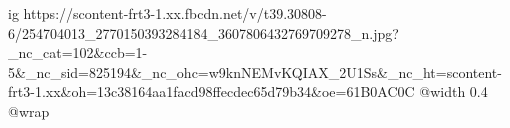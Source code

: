  
 
 
 
 

\ifcmt
  ig https://scontent-frt3-1.xx.fbcdn.net/v/t39.30808-6/254704013_2770150393284184_3607806432769709278_n.jpg?_nc_cat=102&ccb=1-5&_nc_sid=825194&_nc_ohc=w9knNEMvKQIAX_2U1Ss&_nc_ht=scontent-frt3-1.xx&oh=13c38164aa1facd98ffecdec65d79b34&oe=61B0AC0C
  @width 0.4
  @wrap 
\fi

